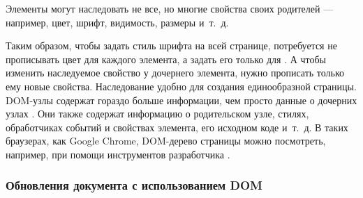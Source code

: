 %
%
%
%

Элементы могут наследовать не все, но многие свойства своих родителей --- например, цвет, шрифт, видимость, размеры и~т.~д.

Таким образом, чтобы задать стиль шрифта на всей странице, потребуется не прописывать цвет для каждого элемента, а задать его только для .
А чтобы изменить наследуемое свойство у дочернего элемента, нужно прописать только ему новые свойства.
Наследование удобно для создания единообразной страницы.
DOM-узлы содержат гораздо больше информации, чем просто данные о дочерних узлах \cite{dom-element}.
Они также содержат информацию о родительском узле, стилях, обработчиках событий и свойствах элемента, его исходном  коде и~т.~д.
В таких браузерах, как Google Chrome, DOM-дерево страницы можно посмотреть, например, при помощи инструментов разработчика \cite{devtools}.

%
%

\subsubsection{Обновления документа с использованием DOM}

